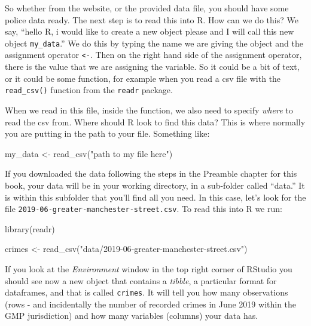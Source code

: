 \documentclass[
]{book}
\makeatletter
\newenvironment{Shaded}{\begin{snugshade}}{\end{snugshade}}
\newcommand{\FunctionTok}[1]{\textcolor[rgb]{0,0,0}{#1}}
\newcommand{\NormalTok}[1]{#1}
\newcommand{\OtherTok}[1]{\textcolor[rgb]{0.37,0.37,0.37}{#1}}
\newcommand{\StringTok}[1]{\textcolor[rgb]{0.5,0.5,0.5}{#1}}
\newenvironment{kframe}{%
\medskip{}
\setlength{\fboxsep}{.8em}
 \def\at@end@of@kframe{}%
 \ifinner\ifhmode%
  \def\at@end@of@kframe{\end{minipage}}%
  \begin{minipage}{\columnwidth}%
 \fi\fi%
 \def\FrameCommand##1{\hskip\@totalleftmargin \hskip-\fboxsep
 \colorbox{shadecolor}{##1}\hskip-\fboxsep
     \hskip-\linewidth \hskip-\@totalleftmargin \hskip\columnwidth}%
 \MakeFramed {\advance\hsize-\width
   \@totalleftmargin\z@ \linewidth\hsize
   \@setminipage}}%
 {\par\unskip\endMakeFramed%
 \at@end@of@kframe}
\renewenvironment{Shaded}{\begin{kframe}}{\end{kframe}}
\makeatother
\begin{document}
So whether from the website, or the provided data file, you should have some police data ready. The next step is to read this into R. How can we do this? We say, ``hello R, i would like to create a new object please and I will call this new object \texttt{my\_data}.'' We do this by typing the name we are giving the object and the assignment operator \texttt{\textless{}-}. Then on the right hand side of the assignment operator, there is the value that we are assigning the variable. So it could be a bit of text, or it could be some function, for example when you read a csv file with the \texttt{read\_csv()} function from the \texttt{readr} package.

When we read in this file, inside the function, we also need to specify \emph{where} to read the csv from. Where should R look to find this data? This is where normally you are putting in the path to your file. Something like:

\begin{Shaded}
\begin{Highlighting}[]
\NormalTok{my\_data }\OtherTok{\textless{}{-}} \FunctionTok{read\_csv}\NormalTok{(}\StringTok{"path to my file here"}\NormalTok{)}
\end{Highlighting}
\end{Shaded}

If you downloaded the data following the steps in the Preamble chapter for this book, your data will be in your working directory, in a sub-folder called ``data.'' It is within this subfolder that you'll find all you need. In this case, let's look for the file \texttt{2019-06-greater-manchester-street.csv}. To read this into R we run:

\begin{Shaded}
\begin{Highlighting}[]
\FunctionTok{library}\NormalTok{(readr)}

\NormalTok{crimes }\OtherTok{\textless{}{-}} \FunctionTok{read\_csv}\NormalTok{(}\StringTok{"data/2019{-}06{-}greater{-}manchester{-}street.csv"}\NormalTok{)}
\end{Highlighting}
\end{Shaded}

If you look at the \emph{Environment} window in the top right corner of RStudio you should see now a new object that contains a \emph{tibble}, a particular format for dataframes, and that is called \texttt{crimes}. It will tell you how many observations (rows - and incidentally the number of recorded crimes in June 2019 within the GMP jurisdiction) and how many variables (columns) your data has.
\end{document}
